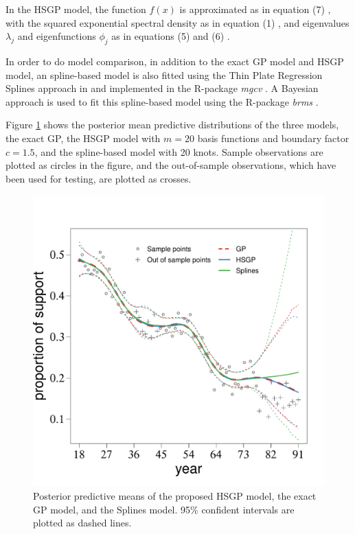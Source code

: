 \documentclass[onecolumn,a4paper,11pt]{article}
\begin{document}
In the HSGP model, the function $f(x)$ is approximated as in equation (7)%
, with the squared exponential spectral density as in equation (1)%
, and eigenvalues $\lambda_j$  and eigenfunctions $\phi_j$ as in equations (5) %
and (6)%
. 

In order to do model comparison, in addition to the exact GP model and HSGP model, an spline-based model is also fitted using the Thin Plate Regression Splines approach in \cite{wood2003thin} and implemented in the R-package \textit{mgcv} \citep{wood2011mgcv}. A Bayesian approach is used to fit this spline-based model using the R-package \textit{brms} \citep{burkner2017brms}.

Figure \ref{ch5_fig12_Posteriors_gaydata} shows the posterior mean predictive distributions of the three models, the exact GP, the HSGP model with $m=20$ basis functions and boundary factor $c=1.5$, and the spline-based model with 20 knots. Sample observations are plotted as circles in the figure, and the out-of-sample observations, which have been used for testing, are plotted as crosses.

\begin{figure}
\centering
\includegraphics[scale=0.50]{ch5_fig12_Posteriors_gaydata.pdf}
\caption{Posterior predictive means of the proposed HSGP model, the exact GP model, and the Splines model. 95\% confident intervals are plotted as dashed lines.}
  \label{ch5_fig12_Posteriors_gaydata}
\end{figure}
\end{document}
